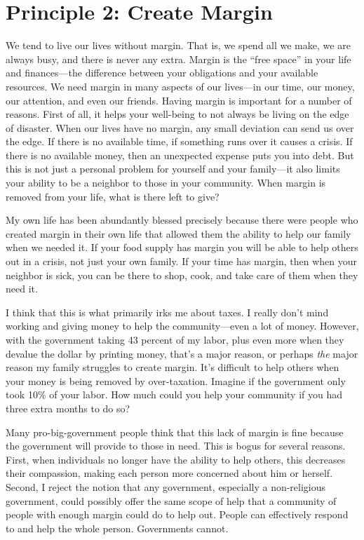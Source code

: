 \section{Principle 2: Create Margin}

We tend to live our lives without margin. That is, we spend all we make,
we are always busy, and there is never any extra. Margin is the ``free
space'' in your life and finances---the difference between your
obligations and your available resources.  We need margin in many
aspects of our lives---in our time, our money, our attention, and even
our friends.  Having margin is important for a number of reasons. 
First of all, it helps your well-being to not always be living on the
edge of disaster.  When our lives have no margin, any small deviation
can send us over the edge.  If there is no available time, if something
runs over it causes a crisis.  If there is no available money, then an
unexpected expense puts you into debt.  But this is not just a personal
problem for yourself and your family---it also limits your ability to
be a neighbor to those in your community. 
When margin is removed from your life, what is there left to give?  

My own life has been abundantly blessed precisely because there were
people who created margin in their own life that allowed them the
ability to help our family when we needed it. If your food supply has
margin you will be able to help others out
in a crisis, not just your own family.  If
your time has margin, then when your neighbor is sick, you can be there
to shop, cook, and take care of them when they need it.

I think that this is what primarily irks me about taxes. I really
don't mind working and giving money to help the
community---even a lot of money. However, with the government taking 43
percent of my labor, plus even more when they devalue the dollar by printing money, 
that’s a major reason, or perhaps \textit{the} major reason my family
struggles to create margin. It’s difficult to help others when your
money is being removed by over-taxation.  Imagine if the government
only took 10\% of your labor.  How much could you help your community
if you had three extra months to do so?

Many pro-big-government people think that this lack of margin is fine because the
government will provide to those in need. This is bogus for several
reasons. First, when individuals no longer have the ability to help
others, this decreases their compassion,
making each person more concerned about him or herself.  Second, I
reject the notion that any government,
especially a non-religious government, could possibly offer the same
scope of help that a
community of people with enough margin could do to help out. People
can effectively respond to and help the whole person. Governments
cannot. 

